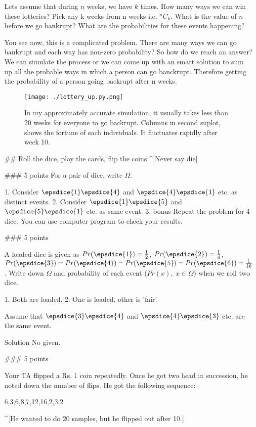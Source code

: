 \documentclass[a4paper,10pt]{article}
\begin{document}
Lets assume that during $n$ weeks, we have $k$ times. How many ways we can win
these lotteries? Pick any k weeks from n weeks i.e. $^nC_k$. What is the value
of $n$ before we go bankrupt? What are the probabilities for these events
happening?

You see now, this is a complicated problem. There are many ways we can go
bankrupt and each way has non-zero probability? So how do we reach an answer? We
can simulate the process or we can come up with an smart solution to sum up all
the probable ways in which a person can go banckrupt. Therefore getting the
probability of a person going backrupt after n weeks.

\begin{figure}
    \texttt{[image: ./lottery\_up.py.png]}
    \caption{In my approximately accurate simulation, it usually takes less than 20 weeks
        for everyone to go backrupt. Columns in second suplot, shows the fortune of each
    individuals. It fluctuates rapidly  after week 10.}
\end{figure}

## Roll the dice, play the cards, flip the coins
^[Never say die]

### 5 points 
For a pair of dice, write $\Omega$.

1. Consider $\epsdice{1}\epsdice{4}$ and $\epsdice{4}\epsdice{1}$ etc. as
distinct events.
2. Consider $\epsdice{1}\epsdice{5}$ and $\epsdice{5}\epsdice{1}$ etc. as same
event.
3. bonus Repeat the problem for 4 dice. You can use computer program to
check your results.

### 5 points

A loaded dice is given as $Pr(\epsdice{1})=\frac{1}{2}$,
$Pr(\epsdice{2})=\frac{1}{4}$, $Pr(\epsdice{3}) = Pr(\epsdice{4}) = Pr(
\epsdice{5}) = Pr(\epsdice{6}) = \frac{1}{16}$. Write down $\Omega$ and
probability of each event ($Pr(x),\; x \in \Omega$) when we roll
two dice.

1. Both are loaded.
2. One is loaded, other is 'fair'.

Assume that $\epsdice{3}\epsdice{4}$ and $\epsdice{4}\epsdice{3}$ etc. are the
same event.

Solution No given.

### 5 points

Your TA flipped a Rs. 1 coin repeatedly. Once he got two head in succession,
he noted down the number of flips. He got the following sequence:

    6,3,6,8,7,12,16,2,3,2

^[He wanted to do 20 samples, but he flipped out after 10.] 
\end{document}
